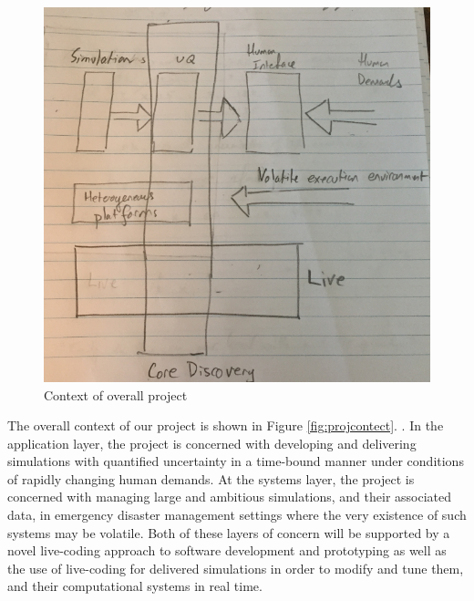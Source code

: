\begin{figure}
  \begin{center}
    \includegraphics[scale=0.5]{figures/overallProject.PNG}%
    \caption{Context of overall project}\label{projectFig}
  \end{center}
\end{figure}




%

%

%




%

%





%

\iffalse
The overall context of our project is shown in
Figure \ref{fig:projcontect}.  . In the application layer, the project
is concerned with developing and delivering simulations with
quantified uncertainty in a time-bound manner under conditions of
rapidly changing human demands. At the systems layer, the project is
concerned with managing large and ambitious simulations, and their
associated data, in emergency disaster management settings where the
very existence of such systems may be volatile. Both of these layers
of concern will be supported by a novel live-coding approach to
software development and prototyping as well as the use of live-coding
for delivered simulations in order to modify and tune them, and their
computational systems in real time.



